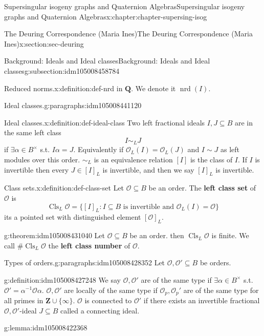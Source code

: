 \documentclass[oneside,10pt,]{book}
\newcommand{\terminology}[1]{\textbf{#1}}
\numberwithin{equation}{section}
\newcommand{\inv}{^{-1}}
\newcommand{\lb}{[}
\newcommand{\rb}{]}
\newcommand{\ZZ}{\mathbf{Z}}
\newcommand{\QQ}{\mathbf{Q}}
\newcommand{\ints}{\mathcal{O}}
\begin{document}
\begin{chapterptx}{Supersingular isogeny graphs and Quaternion Algebras}{}{Supersingular isogeny graphs and Quaternion Algebras}{}{}{x:chapter:chapter-supersing-isog}
\begin{sectionptx}{The Deuring Correspondence (Maria Ines)}{}{The Deuring Correspondence (Maria Ines)}{}{}{x:section:sec-deuring}
\begin{subsectionptx}{Background: Ideals and Ideal classes}{}{Background: Ideals and Ideal classes}{}{}{g:subsection:idm105008458784}
\begin{definition}{Reduced norms.}{x:definition:def-nrd}
in \(\QQ\). We denote it \(\operatorname{nrd}(I)\).%
\end{definition}
\begin{paragraphs}{Ideal classes.}{g:paragraphs:idm105008441120}%
\begin{definition}{Ideal classes.}{x:definition:def-ideal-class}%
Two left fractional ideals \(I,J \subseteq B\) are in the same left class%
\begin{equation*}
I\sim_L J
\end{equation*}
if \(\exists  \alpha \in B^\times\) s.t. \(I\alpha = J\). Equivalently if \(\ints_L(I)  = \ints_L(J)\) and \(I \sim J\) as left modules over this order. \(\sim_L\) is an equivalence relation \(\lb I \rb\) is the class of \(I\). If \(I \) is invertible then every \(J \in \lb I \rb_L\) is invertible, and then we say \(\lb I \rb_L \) is invertible.%
\end{definition}
\begin{definition}{Class sets.}{x:definition:def-class-set}%
Let \(\ints \subseteq B\) be an order. The \terminology{left class set} of \(\ints\) is%
\begin{equation*}
\operatorname{Cls}_L \ints   = \{ \lb I \rb_L : I \subseteq B \text{ is invertible  and } \ints_L(I) = \ints\}
\end{equation*}
its a pointed set with distinguished element \(\lb \ints \rb_L\).%
\end{definition}
\begin{theorem}{}{}{g:theorem:idm105008431040}%
Let \(\ints \subseteq B\) be an order. then \(\operatorname{Cls} _L \ints\) is finite. We call \(\# \operatorname{Cls}_L\ints \) the \terminology{left class number} of \(\ints\).%
\end{theorem}
\end{paragraphs}%
\begin{paragraphs}{Types of orders.}{g:paragraphs:idm105008428352}%
Let \(\ints ,\ints'  \subseteq B\) be orders.%
\begin{definition}{}{g:definition:idm105008427248}%
We say \(\ints,\ints' \) are of the same type if \(\exists \alpha \in B^\times\) s.t. \(\ints ' = \alpha \inv \ints \alpha\). \(\ints,\ints'\) are locally of the same type if \(\ints_p, \ints_p'\) are of the same type for all primes in \(\ZZ\cup\{\infty\}\). \(\ints\) is connected to  \(\ints'\) if there exists an invertible fractional \(\ints,\ints'\)-ideal \(J \subseteq B\) called a connecting ideal.%
\end{definition}
\begin{lemma}{}{}{g:lemma:idm105008422368}%

\end{lemma}
\end{paragraphs}
\end{subsectionptx}
\end{sectionptx}
\end{chapterptx}
\end{document}
